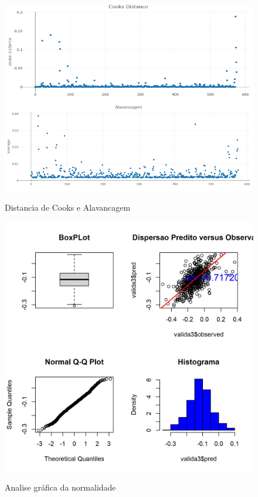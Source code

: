 		 \begin{minipage}[t!]{0.32\textwidth}
				\begin{figure}[H]
					\centering  \small \caption{Distancia de Cooks e Alavancagem}
					\includegraphics[width=0.97\linewidth]{FIGURAS/dist-cook-alavan}
					\label{fig:DISTCOOK}
				\end{figure}
				
			\end{minipage}\hfill
			\begin{minipage}[t!]{0.332\textwidth}
					\begin{figure}[H]
				    \centering  \small \caption{Analise gráfica da  normalidade}
					\includegraphics[width=0.97\linewidth]{FIGURAS/valicas}
					\label{fig:valicas}
				\end{figure}
				
			\end{minipage}\hfill
